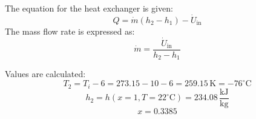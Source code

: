 The equation for the heat exchanger is given:  
\[
Q = \dot{m} (h_2 - h_1) - \dot{U}_\text{in}
\]  
The mass flow rate is expressed as:  
\[
\dot{m} = \frac{\dot{U}_\text{in}}{h_2 - h_1}
\]  

Values are calculated:  
\[
T_2 = T_i - 6 = 273.15 - 10 - 6 = 259.15 \, \text{K} = -76^\circ\text{C}
\]  
\[
h_2 = h(x=1, T=22^\circ\text{C}) = 234.08 \, \frac{\text{kJ}}{\text{kg}}
\]  
\[
x = 0.3385
\]